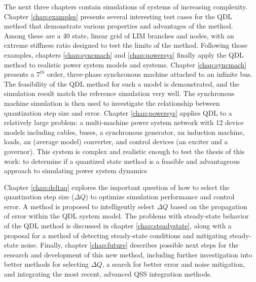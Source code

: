 The next three chapters contain simulations of systems of increasing complexity. Chapter \ref{chap:examples} presents several interesting test cases for the QDL method that demonstrate various properties and advantages of the method. Among these are a 40 state, linear grid of LIM branches and nodes, with an extreme stiffness ratio designed to test the limits of the method. Following those examples, chapters \ref{chap:syncmach} and \ref{chap:powersys} finally apply the QDL method to realistic power system models and systems. Chapter \ref{chap:syncmach} presents a $7^{th}$ order, three-phase synchronous machine attached to an infinite bus. The feasibility of the QDL method for such a model is demonstrated, and the simulation result match the reference simulation very well. The synchronous machine simulation is then used to investigate the relationship between quantization step size and error. Chapter \ref{chap:powersys} applies QDL to a relatively large problem: a multi-machine power system network with 12 device models including cables, buses, a synchronous generator, an induction machine, loads, an (average model) converter, and control devices (an exciter and a governor). This system is complex and realistic enough to test the thesis of this work: to determine if a quantized state method is a feasible and advantageous approach to simulating power system dynamics

Chapter \ref{chap:deltaq} explores the important question of how to select the quantization step size ($\Delta Q$) to optimize simulation performance and control error. A method is proposed to intelligently select $\Delta Q$ based on the propagation of error within the QDL system model. The problems with steady-state behavior of the QDL method is discussed in chapter \ref{chap:steadystate}, along with a proposal for a method of detecting steady-state conditions and mitigating steady-state noise. Finally, chapter \ref{chap:future} describes possible next steps for the research and development of this new method, including further investigation into better methods for selecting $\Delta Q$, a search for better error and noise mitigation, and integrating the most recent, advanced QSS integration methods.
